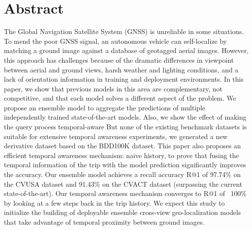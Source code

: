 \documentclass[10pt,letterpaper]{article}
\begin{document}
\section*{Abstract}
The Global Navigation Satellite System (GNSS) is unreliable in some situations. To mend the poor GNSS signal, an autonomous vehicle can self-localize by matching a ground image against a database of geotagged aerial images. However, this approach has challenges  because of the dramatic differences in viewpoint between aerial and ground views, harsh weather and lighting conditions, and a lack of orientation information in training and deployment environments. In this paper, we show that previous models in this area are complementary, not competitive, and that each model solves a different aspect of the problem. We propose an ensemble model to aggregate the predictions of multiple independently trained state-of-the-art models. Also, we show the effect of making the query process temporal-aware  But none of the existing benchmark datasets is suitable for extensive temporal awareness experiments, we generated a new derivative dataset based on the BDD100K dataset. This paper also proposes an efficient temporal awareness mechanism: naive history, to prove that fusing the temporal information of the trip with the model prediction significantly improves the accuracy. Our ensemble model achieves a recall accuracy R@1 of 97.74\% on the CVUSA dataset and 91.43\% on the CVACT dataset (surpassing the current state-of-the-art). Our temporal awareness mechanism converges to R@1 of ~100\% by looking at a few steps back in the trip history. We expect this study to initialize the building of deployable ensemble cross-view geo-localization models that take advantage of temporal proximity between ground images.

\end{document}
